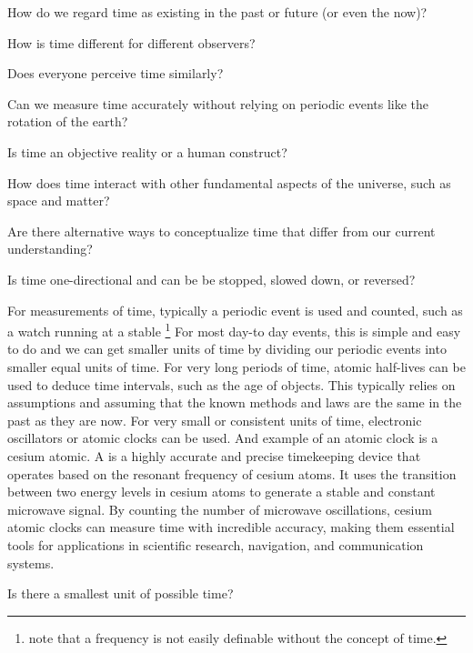 \begin{questions}
	\item How do we regard time as existing in the past or future (or even the now)?
 	\item How is time different for different observers?
  	\item Does everyone perceive time similarly?
   	\item Can we measure time accurately without relying on periodic events like the rotation of the earth?
    	\item Is time an objective reality or a human construct?
     	\item How does time interact with other fundamental aspects of the universe, such as space and matter?
      	\item Are there alternative ways to conceptualize time that differ from our current understanding?
       	\item Is time one-directional and can be be stopped, slowed down, or reversed?
\end{questions}

For measurements of time, typically a periodic event is used and counted, such as a watch running at a stable \footnote{note that a frequency is not easily definable without the concept of time.} For most day-to day events, this is simple and easy to do and we can get smaller units of time by dividing our periodic events into smaller equal units of time. For very long periods of time, atomic half-lives can be used to deduce time intervals, such as the age of objects. This typically relies on assumptions and assuming that the known methods and laws are the same in the past as they are now. For very small or consistent units of time, electronic oscillators or atomic clocks can be used. And example of an atomic clock is a cesium atomic. A  is a highly accurate and precise timekeeping device that operates based on the resonant frequency of cesium atoms. It uses the transition between two energy levels in cesium atoms to generate a stable and constant microwave signal. By counting the number of microwave oscillations, cesium atomic clocks can measure time with incredible accuracy, making them essential tools for applications in scientific research, navigation, and communication systems.

\begin{questions}
	\item Is there a smallest unit of possible time?
\end{questions}

